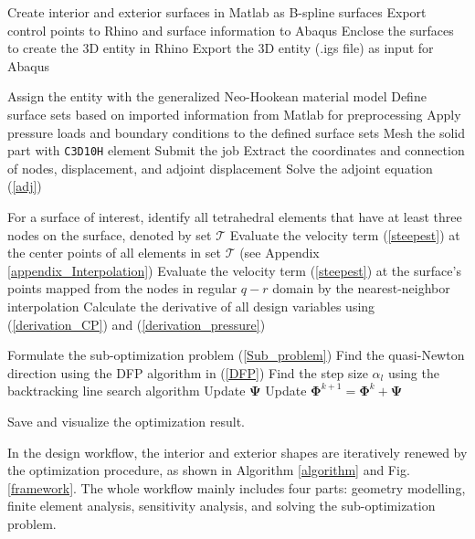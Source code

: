 \documentclass[journal]{IEEEtran}
\renewcommand{\vec}[1]{\mathbf{#1}}
\theoremstyle{definition}
\renewcommand{\vec}[1]{\mathbf{#1}}
\begin{document}
\begin{algorithm}[!t]

  {
    \CAD{}
    Create interior and exterior surfaces in Matlab as B-spline surfaces\;
    Export control points to Rhino and surface information to Abaqus\;
    Enclose the surfaces to create the 3D entity in Rhino\;
    Export the 3D entity (.igs file) as input for Abaqus\;

    \FEA{}
    Assign the entity with the generalized Neo-Hookean material model\;
    Define surface sets based on imported information from Matlab for preprocessing\;
    Apply pressure loads and boundary conditions to the defined surface sets\;
    Mesh the solid part with \texttt{C3D10H} element\;
    Submit the job\;
    Extract the coordinates and connection of nodes, displacement, and adjoint displacement\;
    Solve the adjoint equation (\ref{adj})\;

    \Opt{}
    For a surface of interest, identify all tetrahedral elements that have at least three nodes on the surface, denoted by set $\mathcal{T}$\;
    Evaluate the velocity term (\ref{steepest}) at the center points of all elements in set $\mathcal{T}$ (see Appendix \ref{appendix_Interpolation})\;
    Evaluate the velocity term (\ref{steepest}) at the surface's points mapped from the nodes in regular $q-r$ domain by the nearest-neighbor interpolation\;
    Calculate the derivative of all design variables using (\ref{derivation_CP}) and (\ref{derivation_pressure})\;

    \Sub{}
    Formulate the sub-optimization problem (\ref{Sub_problem})\;
    {
      Find the quasi-Newton direction using the DFP algorithm in (\ref{DFP})\;
      Find the step size $\alpha_l$ using the backtracking line search algorithm\;
      Update $\vec{\Psi}$ \;
    }
    Update $\vec{\Phi}^{k+1}=\vec{\Phi}^{k}+\vec{\Psi}$ \;
  }
  Save and visualize the optimization result.
  \caption{Design Optimization Workflow.}
  \label{algorithm}
\end{algorithm}

In the design workflow, the interior and exterior shapes are iteratively renewed by the optimization procedure, as shown in Algorithm \ref{algorithm} and Fig. \ref{framework}. The whole workflow mainly includes four parts: geometry modelling, finite element analysis, sensitivity analysis, and solving the sub-optimization problem.
\end{document}
